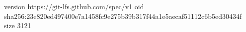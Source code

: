 version https://git-lfs.github.com/spec/v1
oid sha256:23e820ed497400e7a1458fc9e275b39b317f44a1e5aecaf51112c6b5ed30434f
size 3121
